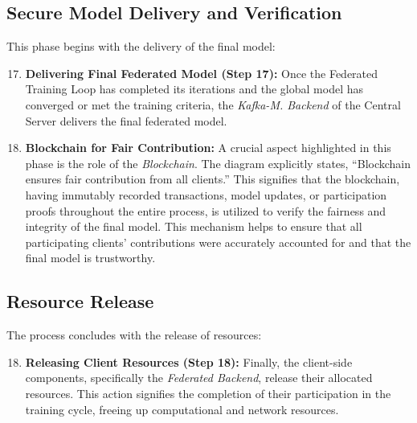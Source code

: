 \subsection{Secure Model Delivery and Verification}
\label{ssec:model_delivery}
This phase begins with the delivery of the final model:
\begin{enumerate}
    \setcounter{enumi}{16} %
    \item \textbf{Delivering Final Federated Model (Step 17):} Once the Federated Training Loop has completed its iterations and the global model has converged or met the training criteria, the \textit{Kafka-M. Backend} of the Central Server delivers the final federated model.
\item \textbf{Blockchain for Fair Contribution:} A crucial aspect highlighted in this phase is the role of the \textit{Blockchain}. The diagram explicitly states, ``Blockchain ensures fair contribution from all clients.'' This signifies that the blockchain, having immutably recorded transactions, model updates, or participation proofs throughout the entire process, is utilized to verify the fairness and integrity of the final model. This mechanism helps to ensure that all participating clients' contributions were accurately accounted for and that the final model is trustworthy.
\end{enumerate}

\subsection{Resource Release}
\label{ssec:resource_release}
The process concludes with the release of resources:
\begin{enumerate}
    \setcounter{enumi}{17} %
    \item \textbf{Releasing Client Resources (Step 18):} Finally, the client-side components, specifically the \textit{Federated Backend}, release their allocated resources. This action signifies the completion of their participation in the training cycle, freeing up computational and network resources.
\end{enumerate}


